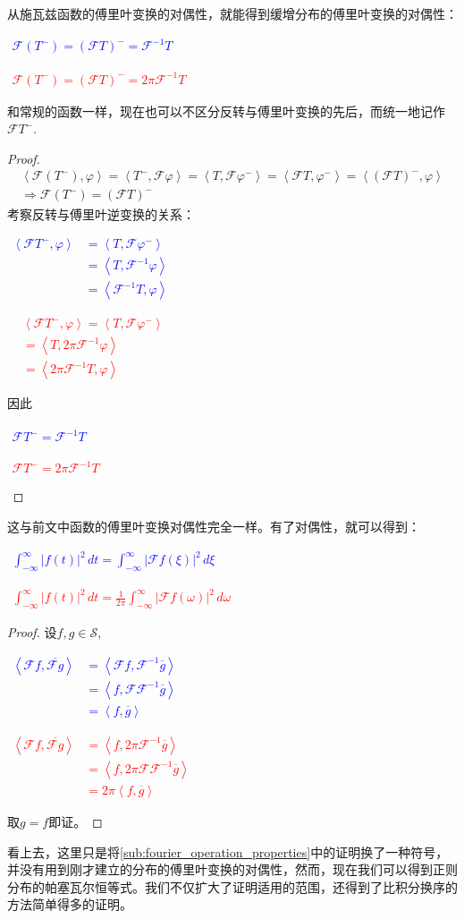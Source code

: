 \documentclass{ctexbook}
\newcommand{\lr}[2]{%
    \begin{center}
    \begin{minipage}[t]{0.45\textwidth}
        \centering
        \allowdisplaybreaks
        \textcolor{blue}{%
            \begin{varwidth}{\linewidth}
            $\begin{aligned}
            #1
            \end{aligned}$
            \end{varwidth}
        }
    \end{minipage}
    \hfill
    \begin{minipage}[t]{0.45\textwidth}
        \centering
        \allowdisplaybreaks
        \textcolor{red}{%
            \begin{varwidth}{\linewidth}
            $\begin{aligned}
            #2
            \end{aligned}$
            \end{varwidth}
        }
    \end{minipage}
\end{center}
}
\begin{document}
从施瓦兹函数的傅里叶变换的对偶性，就能得到缓增分布的傅里叶变换的对偶性：
\begin{theorem}[分布傅里叶变换的对偶性]
    \quad
    \lr{
    \mathcal{F}(T^-)= (\mathcal{F}T)^-=\mathcal{F} ^{-1}T
    }{
    \mathcal{F}(T^-)= (\mathcal{F}T)^-=2\pi\mathcal{F} ^{-1}T
    }
\end{theorem}
和常规的函数一样，现在也可以不区分反转与傅里叶变换的先后，而统一地记作$\mathcal{F} T^-$.
\begin{proof}
    \begin{align*}
    \left\langle\mathcal{F}(T^-),\varphi\right\rangle=\left\langle T^-,\mathcal{F}\varphi\right\rangle=\left\langle T,\mathcal{F} \varphi^-\right\rangle=\left\langle\mathcal{F}T,\varphi^-\right\rangle=\left\langle(\mathcal{F}T)^-,\varphi\right\rangle \\
    \Rightarrow\mathcal{F}(T^-)= (\mathcal{F}T)^-
\end{align*}
考察反转与傅里叶逆变换的关系：
\lr{
    \left\langle\mathcal{F}T^-,\varphi\right\rangle&=\left\langle T,\mathcal{F}\varphi^-\right\rangle\\
    &=\left\langle T,\mathcal{F} ^{-1}\varphi\right\rangle\\
    &=\left\langle\mathcal{F}^{-1}T,\varphi\right\rangle
}{
    &\left\langle\mathcal{F}T^-,\varphi\right\rangle=\left\langle T,\mathcal{F}\varphi^-\right\rangle\\
    &=\left\langle T,2\pi\mathcal{F} ^{-1}\varphi\right\rangle\\
    &=\left\langle2\pi\mathcal{F}^{-1}T,\varphi\right\rangle
}
因此\lr{
    \mathcal{F}T^-= \mathcal{F}^{-1}T
}{
    \mathcal{F}T^-= 2\pi\mathcal{F}^{-1}T
}
\end{proof}
这与前文中函数的傅里叶变换对偶性完全一样。有了对偶性，就可以得到：
\begin{theorem}
    \quad
    \lr{
    \int_{-\infty}^{\infty}|f(t)|^2\,dt=\int_{-\infty}^{\infty}|\mathcal{F} f(\xi)|^2\,d\xi
}{
    \int_{-\infty}^{\infty}|f(t)|^2\,dt=\frac{1}{2\pi}\int_{-\infty}^{\infty}|\mathcal{F} f(\omega)|^2\,d\omega
}
\end{theorem}
\begin{proof}
设$f,g\in\mathcal{S} $,\lr{
    \left\langle \mathcal{F} f,\overline{\mathcal{F} g}\right\rangle&=\left\langle \mathcal{F} f,\mathcal{F}^{-1}\overline{g}\right\rangle\\
    &=\left\langle f,\mathcal{F} \mathcal{F} ^{-1}\overline{g}\right\rangle\\
    &=\left\langle f,\overline{g}\right\rangle
}{
    \left\langle \mathcal{F} f,\overline{\mathcal{F} g}\right\rangle&=\left\langle f,2\pi\mathcal{F}^{-1}\overline{g}\right\rangle\\
    &=\left\langle f,2\pi\mathcal{F} \mathcal{F} ^{-1}\overline{g}\right\rangle\\
    &=2\pi\left\langle f,\overline{g}\right\rangle
}
取$g=f$即证。
\end{proof}
看上去，这里只是将\ref{sub:fourier_operation_properties}中的证明换了一种符号，并没有用到刚才建立的分布的傅里叶变换的对偶性，然而，现在我们可以得到正则分布的帕塞瓦尔恒等式。我们不仅扩大了证明适用的范围，还得到了比积分换序的方法简单得多的证明。
\end{document}
